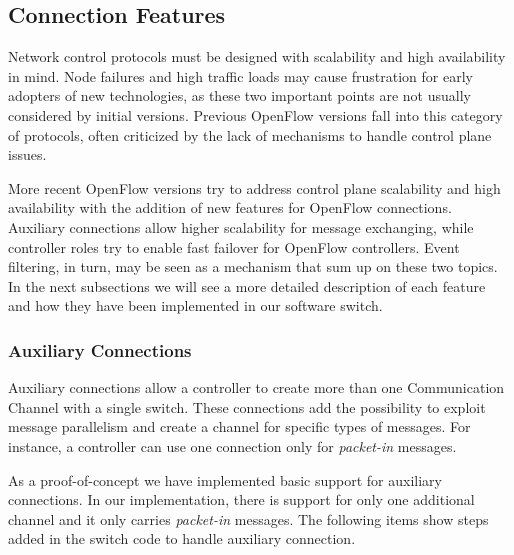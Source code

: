 \label{sec:sec44}

\subsection{Connection Features}
\label{sec:sec45}

    Network control protocols must be designed with scalability and high availability in mind. Node failures and high traffic loads may cause frustration for early adopters of new technologies, as these two important points are not usually considered by initial versions. Previous OpenFlow versions fall into this category of protocols, often criticized by the lack of mechanisms to handle control plane issues. 
    
    More recent OpenFlow versions try to address control plane scalability and high availability with the addition of new features for OpenFlow connections. Auxiliary connections allow higher scalability for message exchanging, while controller roles try to enable fast failover for OpenFlow controllers. Event filtering, in turn, may be seen as a mechanism that sum up on these two topics. In the next subsections we will see a more detailed description of each feature and how they have been implemented in our software switch.
    
    \subsubsection{Auxiliary Connections}
    
    Auxiliary connections allow a controller to create more than one Communication Channel with a single switch. These connections add the possibility to exploit message parallelism and create a channel for specific types of messages. For instance, a controller can use one connection only for \textit{packet-in} messages. 
    
    As a proof-of-concept we have implemented basic support for auxiliary connections. In our implementation, there is support for only one additional channel and it only carries \textit{packet-in} messages. The following items show steps added in the switch code to handle auxiliary connection.
    
